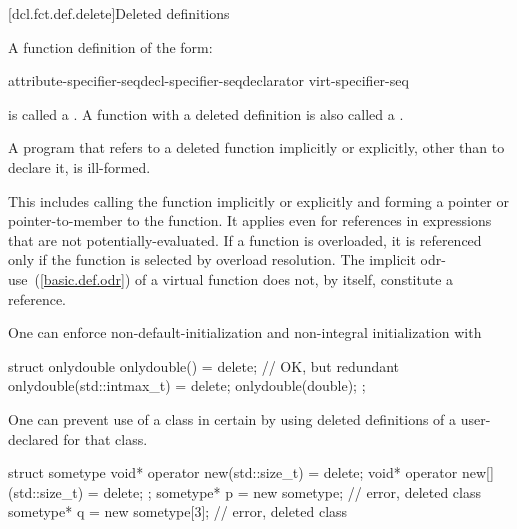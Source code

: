 [dcl.fct.def.delete]{Deleted definitions}%

\pnum
A function definition of the form:

\begin{ncbnf}
    attribute-specifier-seq\opt decl-specifier-seq\opt declarator virt-specifier-seq\opt{} 
\end{ncbnf}

is called a . A function with a
deleted definition is also called a .

\pnum
A program that refers to a deleted function implicitly or explicitly, other
than to declare it, is ill-formed. \begin{note} This includes calling the function
implicitly or explicitly and forming a pointer or pointer-to-member to the
function. It applies even for references in expressions that are not
potentially-evaluated. If a function is overloaded, it is referenced only if the
function is selected by overload resolution. The implicit
odr-use~(\ref{basic.def.odr}) of a virtual function does not, by itself,
constitute a reference. \end{note}

\pnum
\begin{example} One can enforce non-default-initialization and non-integral
initialization with

\begin{codeblock}
struct onlydouble {
  onlydouble() = delete;              // OK, but redundant
  onlydouble(std::intmax_t) = delete;
  onlydouble(double);
};
\end{codeblock}

\end{example}

\begin{example} One can prevent use of a
class in certain  by using deleted definitions
of a user-declared  for that class.

\begin{codeblock}
struct sometype {
  void* operator new(std::size_t) = delete;
  void* operator new[](std::size_t) = delete;
};
sometype* p = new sometype;     // error, deleted class 
sometype* q = new sometype[3];  // error, deleted class 
\end{codeblock}
\end{example}


